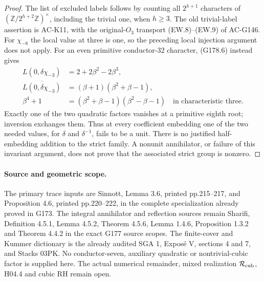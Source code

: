 \begin{proof}
The list of excluded labels follows by counting all
$2^{h+1}$ characters of $(\mathbb Z/2^{h+2}\mathbb Z)^\times$,
including the trivial one, when $h\geq3$.
The old trivial-label assertion is AC-K11, with the original-$O_3$
transport (EW.8)--(EW.9) of AC-G146.
For $\chi_{-8}$ the local value at three is one, so the preceding
local injection argument does not apply.
For an even primitive conductor-32 character, (G178.6) instead gives
\[
 \begin{aligned}
 L(0,\delta\chi_{-3})&=2+2\beta^2-2\beta^3,\\
 \overline{L(0,\delta\chi_{-3})}
     &=(\beta+1)(\beta^2+\beta-1),\\
 \beta^4+1&=(\beta^2+\beta-1)(\beta^2-\beta-1)
                          \quad\text{in characteristic three}.
 \end{aligned}\tag{G178.12}
\]
Exactly one of the two quadratic factors vanishes at a primitive
eighth root; inversion exchanges them.
Thus at every coefficient embedding one of the two needed values,
for $\delta$ and $\delta^{-1}$, fails to be a unit.
There is no justified half-embedding addition to the strict family.
A nonunit annihilator, or failure of this invariant argument,
does not prove that the associated strict group is nonzero.
\end{proof}

\paragraph{Source and geometric scope.}
The primary trace inputs are Sinnott, Lemma 3.6, printed pp.215--217,
and Proposition 4.6, printed pp.220--222, in the complete specialization
already proved in G173.
The integral annihilator and reflection sources remain Sharifi,
Definition 4.5.1, Lemma 4.5.2, Theorem 4.5.6, Lemma 1.4.6,
Proposition 1.3.2 and Theorem 4.4.2 in the exact G177 source scopes.
The finite-cover and Kummer dictionary is the already audited
SGA 1, Expos\'e V, sections 4 and 7, and Stacks 03PK.
No conductor-seven, auxiliary quadratic or nontrivial-cubic factor
is supplied here.  The actual numerical remainder, mixed realization
$\mathcal R_{\rm cub}$, H04.4 and cubic RH remain open.

